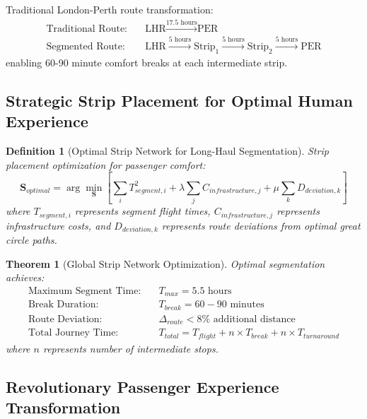 \documentclass[12pt,a4paper]{article}
\newtheorem{theorem}{Theorem}
\newtheorem{definition}{Definition}
\begin{document}
\begin{example}
Traditional London-Perth route transformation:
\begin{align}
\text{Traditional Route:} &\quad \text{LHR} \xrightarrow{17.5 \text{ hours}} \text{PER} \\
\text{Segmented Route:} &\quad \text{LHR} \xrightarrow{5 \text{ hours}} \text{Strip}_1 \xrightarrow{5 \text{ hours}} \text{Strip}_2 \xrightarrow{5 \text{ hours}} \text{PER}
\end{align}
enabling 60-90 minute comfort breaks at each intermediate strip.
\end{example}

\subsection{Strategic Strip Placement for Optimal Human Experience}

\begin{definition}[Optimal Strip Network for Long-Haul Segmentation]
Strip placement optimization for passenger comfort:
\begin{equation}
\mathbf{S}_{optimal} = \arg\min_{\mathbf{S}} \left[ \sum_{i} T_{segment,i}^2 + \lambda \sum_{j} C_{infrastructure,j} + \mu \sum_{k} D_{deviation,k} \right]
\end{equation}
where $T_{segment,i}$ represents segment flight times, $C_{infrastructure,j}$ represents infrastructure costs, and $D_{deviation,k}$ represents route deviations from optimal great circle paths.
\end{definition}

\begin{theorem}[Global Strip Network Optimization]
Optimal segmentation achieves:
\begin{align}
\text{Maximum Segment Time:} &\quad T_{max} = 5.5 \text{ hours} \\
\text{Break Duration:} &\quad T_{break} = 60-90 \text{ minutes} \\
\text{Route Deviation:} &\quad \Delta_{route} < 8\% \text{ additional distance} \\
\text{Total Journey Time:} &\quad T_{total} = T_{flight} + n \times T_{break} + n \times T_{turnaround}
\end{align}
where $n$ represents number of intermediate stops.
\end{theorem}

\subsection{Revolutionary Passenger Experience Transformation}
\end{document}
